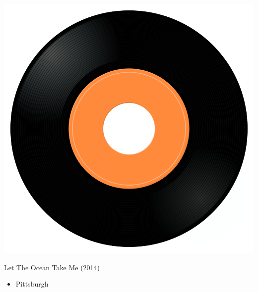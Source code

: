 \begin{minipage}[t]{0.25\textwidth}\vspace{0pt}
\captionsetup{type=figure}
\includegraphics[width=\textwidth]{Images/cover.png}
\caption*{Let The Ocean Take Me (2014)}
\end{minipage}
\begin{minipage}[t]{0.25\textwidth}\vspace{0pt}
\begin{itemize}[nosep,leftmargin=1em,labelwidth=*,align=left]
	\setlength{\itemsep}{0pt}
	\item Pittsburgh
\end{itemize}
\end{minipage}
